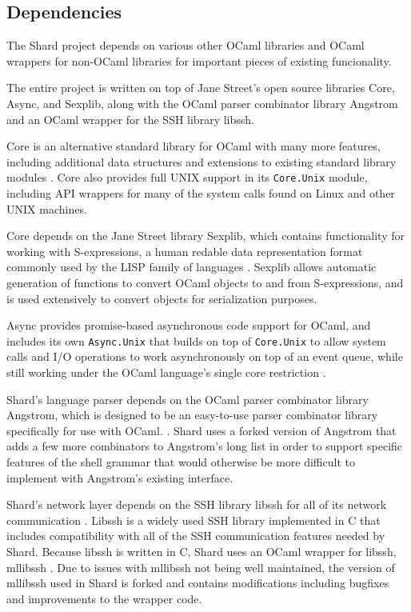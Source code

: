 \documentclass[twoside]{report}
\begin{document}
\subsection{Dependencies}
The Shard project depends on various other OCaml libraries and OCaml wrappers for non-OCaml libraries for important pieces of existing funcionality.

The entire project is written on top of Jane Street's open source libraries Core, Async, and Sexplib, along with the OCaml parser combinator library Angstrom and an OCaml wrapper for the SSH library libssh.

Core is an alternative standard library for OCaml with many more features, including additional data structures and extensions to existing standard library modules \cite{ocamlcore}.
Core also provides full UNIX support in its \texttt{Core.Unix} module, including API wrappers for many of the system calls found on Linux and other UNIX machines.

Core depends on the Jane Street library Sexplib, which contains functionality for working with S-expressions, a human redable data representation format commonly used by the LISP family of languages \cite{mccarthy1960recursive}. Sexplib allows automatic generation of functions to convert OCaml objects to and from S-expressions, and is used extensively to convert objects for serialization purposes.

Async provides promise-based asynchronous code support for OCaml, and includes its own \texttt{Async.Unix} that builds on top of \texttt{Core.Unix} to allow system calls and I/O operations to work asynchronously on top of an event queue, while still working under the OCaml language's single core restriction \cite{ocamlasync}.

Shard's language parser depends on the OCaml parser combinator library Angstrom, which is designed to be an easy-to-use parser combinator library specifically for use with OCaml. \cite{ocamlangstrom}.
Shard uses a forked version of Angstrom that adds a few more combinators to Angstrom's long list in order to support specific features of the shell grammar that would otherwise be more difficult to implement with Angstrom's existing interface.

Shard's network layer depends on the SSH library libssh for all of its network communication \cite{libssh}.
Libssh is a widely used SSH library implemented in C that includes compatibility with all of the SSH communication features needed by Shard.
Because libssh is written in C, Shard uses an OCaml wrapper for libssh, mllibssh \cite{mllibssh}.
Due to issues with mllibssh not being well maintained, the version of mllibssh used in Shard is forked and contains modifications including bugfixes and improvements to the wrapper code.
\end{document}

